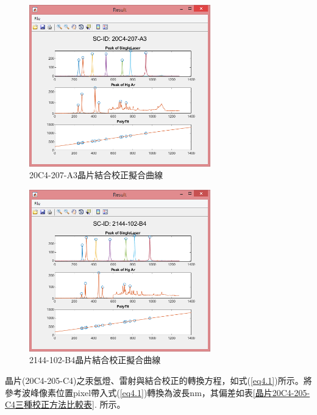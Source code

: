 \begin{figure}[H] %
	\centering %
	\vspace{0.8cm}
	\includegraphics[width=0.7\textwidth]{figures/Result/比較/A3-COM.jpg} %
	\caption{20C4-207-A3晶片結合校正擬合曲線} %
	\label{A3晶片結合校正擬合曲線} %
\end{figure}
\begin{figure}[H] %
	\centering %
	\vspace{0.8cm}
	\includegraphics[width=0.7\textwidth]{figures/Result/比較/B4-COM.jpg} %
	\caption{2144-102-B4晶片結合校正擬合曲線} %
	\label{B4晶片結合校正擬合曲線} %
\end{figure}
\newpage
晶片(20C4-205-C4)之汞氬燈、雷射與結合校正的轉換方程，如式(\ref{eq4.1})所示。將參考波峰像素位置pixel帶入式(\ref{eq4.1})轉換為波長nm，其偏差如表\ref{晶片20C4-205-C4三種校正方法比較表}. 所示。
